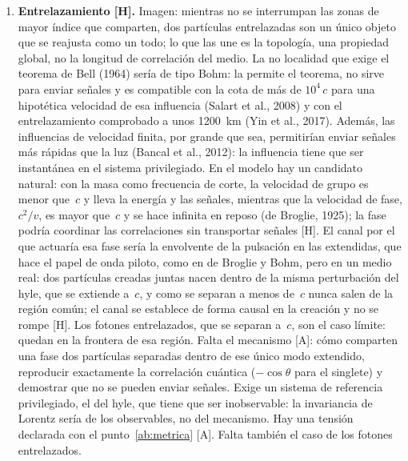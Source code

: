 \documentclass[11pt,a4paper]{article}
\newcommand{\st}[1]{\textup{[#1]}}
\begin{document}
\begin{enumerate}[label=\arabic*.,ref=\arabic*,leftmargin=*]
\item \label{ab:entrelazamiento}\textbf{Entrelazamiento \st{H}.} Imagen: mientras no se interrumpan las zonas de mayor índice que comparten, dos partículas entrelazadas son un único objeto que se reajusta como un todo; lo que las une es la topología, una propiedad global, no la longitud de correlación del medio. La no localidad que exige el teorema de Bell (1964) sería de tipo Bohm: la permite el teorema, no sirve para enviar señales y es compatible con la cota de más de $10^4\,c$ para una hipotética velocidad de esa influencia (Salart et al., 2008) y con el entrelazamiento comprobado a unos 1200~km (Yin et al., 2017). Además, las influencias de velocidad finita, por grande que sea, permitirían enviar señales más rápidas que la luz (Bancal et al., 2012): la influencia tiene que ser instantánea en el sistema privilegiado. En el modelo hay un candidato natural: con la masa como frecuencia de corte, la velocidad de grupo es menor que~$c$ y lleva la energía y las señales, mientras que la velocidad de fase, $c^2/v$, es mayor que~$c$ y se hace infinita en reposo (de Broglie, 1925); la fase podría coordinar las correlaciones sin transportar señales \st{H}. El canal por el que actuaría esa fase sería la envolvente de la pulsación en las extendidas, que hace el papel de onda piloto, como en de Broglie y Bohm, pero en un medio real: dos partículas creadas juntas nacen dentro de la misma perturbación del hyle, que se extiende a~$c$, y como se separan a menos de~$c$ nunca salen de la región común; el canal se establece de forma causal en la creación y no se rompe \st{H}. Los fotones entrelazados, que se separan a~$c$, son el caso límite: quedan en la frontera de esa región. Falta el mecanismo \st{A}: cómo comparten una fase dos partículas separadas dentro de ese único modo extendido, reproducir exactamente la correlación cuántica ($-\cos\theta$ para el singlete) y demostrar que no se pueden enviar señales. Exige un sistema de referencia privilegiado, el del hyle, que tiene que ser inobservable: la invariancia de Lorentz sería de los observables, no del mecanismo. Hay una tensión declarada con el punto~\ref{ab:metrica} \st{A}. Falta también el caso de los fotones entrelazados.


\end{enumerate}
\end{document}
